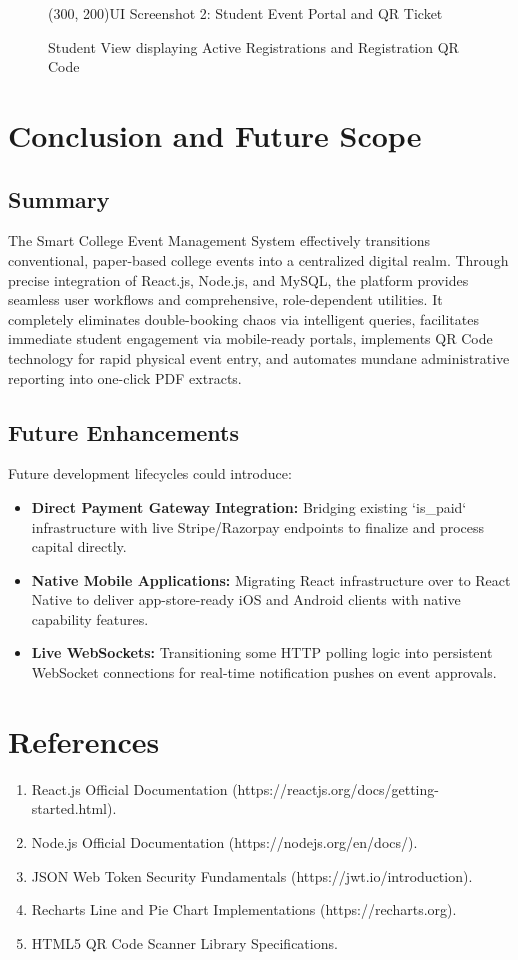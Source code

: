\documentclass[12pt, a4paper]{report}
\begin{document}
\begin{figure}[H]
    \centering
    \framebox(300, 200){UI Screenshot 2: Student Event Portal and QR Ticket}
    \caption{Student View displaying Active Registrations and Registration QR Code}
\end{figure}

\chapter{Conclusion and Future Scope}

\section{Summary}
The Smart College Event Management System effectively transitions conventional, paper-based college events into a centralized digital realm. Through precise integration of React.js, Node.js, and MySQL, the platform provides seamless user workflows and comprehensive, role-dependent utilities. It completely eliminates double-booking chaos via intelligent queries, facilitates immediate student engagement via mobile-ready portals, implements QR Code technology for rapid physical event entry, and automates mundane administrative reporting into one-click PDF extracts. 

\section{Future Enhancements}
Future development lifecycles could introduce:
\begin{itemize}
    \item \textbf{Direct Payment Gateway Integration:} Bridging existing `is\_paid` infrastructure with live Stripe/Razorpay endpoints to finalize and process capital directly.
    \item \textbf{Native Mobile Applications:} Migrating React infrastructure over to React Native to deliver app-store-ready iOS and Android clients with native capability features.
    \item \textbf{Live WebSockets:} Transitioning some HTTP polling logic into persistent WebSocket connections for real-time notification pushes on event approvals.
\end{itemize}

\chapter{References}
\begin{enumerate}
    \item React.js Official Documentation (https://reactjs.org/docs/getting-started.html).
    \item Node.js Official Documentation (https://nodejs.org/en/docs/).
    \item JSON Web Token Security Fundamentals (https://jwt.io/introduction).
    \item Recharts Line and Pie Chart Implementations (https://recharts.org).
    \item HTML5 QR Code Scanner Library Specifications.
\end{enumerate}
\end{document}
